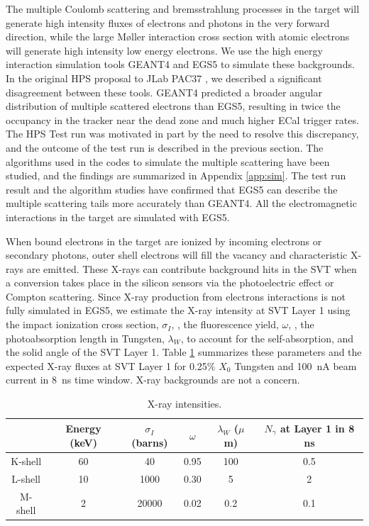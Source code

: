 The multiple Coulomb scattering and bremsstrahlung processes in the target will generate high 
intensity fluxes of electrons and photons in the very forward direction, while the large
M{\o}ller interaction cross section with atomic electrons will generate high intensity low energy
electrons. We use the high energy interaction simulation tools GEANT4 and EGS5 to simulate 
these backgrounds. In the original HPS proposal to JLab PAC37 \cite{HPS_PROP}, we described a significant 
disagreement between these tools. GEANT4 predicted a broader angular
distribution of multiple scattered electrons than EGS5, resulting in twice the occupancy in the
tracker near the dead zone and much higher ECal trigger rates. 
The HPS Test run was motivated in part by the need to resolve this discrepancy, and the outcome of the test run is described 
in the previous section. The algorithms used 
in the codes to simulate the multiple scattering have been studied, and the findings are summarized in
Appendix \ref{app:sim}. The test run result and the algorithm studies have confirmed that EGS5 can describe the multiple scattering 
tails more accurately than GEANT4. All the electromagnetic interactions in the target are simulated with EGS5.   

When bound electrons in the target are ionized by incoming electrons or secondary photons, outer 
shell electrons will fill the vacancy and characteristic X-rays are emitted. 
These X-rays can contribute background hits in
the SVT when a conversion takes place in the silicon sensors via the photoelectric effect 
or Compton scattering. Since X-ray production from electrons interactions is not fully simulated in EGS5, we estimate the X-ray intensity at SVT Layer 1 using the impact ionization cross section, $\sigma_I$, \cite{hoffmann}, the fluorescence yield, $\omega$, \cite{hubbell},
the photoabsorption length in Tungsten, $\lambda_W$, to account for the self-absorption, and the solid 
angle of the SVT Layer 1.
Table \ref{tab:xray} summarizes these parameters and the expected X-ray
fluxes at SVT Layer 1 for 0.25\% $X_0$ Tungsten and 100~nA beam current in 8~ns time window. 
X-ray backgrounds are not a concern.

\begin{table}[h]
\begin{center}
\begin{tabular}{|c|c|c|c|c|c|} \hline
  & Energy (keV) & $\sigma_I$ (barns) & \hspace{0.5 cm} $\omega$ \hspace{0.5 cm} & $\lambda_W$ ($\mu$m) & $N_\gamma$ at Layer 1 in 8 ns   \\ \hline
K-shell & 60 & 40 & 0.95 & 100 & 0.5 \\ \hline
L-shell  & 10 & 1000 & 0.30 & 5 & 2 \\ \hline
M-shell  & 2 & 20000 & 0.02 & 0.2 & 0.1 \\ \hline
\end{tabular}
\end{center}
\caption{\small{X-ray intensities.}}
\label{tab:xray}
\end{table}

